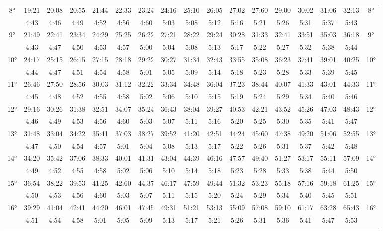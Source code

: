 \begin{scriptsize}
\begin{tabular}{c || c | c | c | c | c | c | c | c | c | c | c | c | c | c | c || c}
		\multirow{2}{*}{8°}&19:21&20:08&20:55&21:44&22:33&23:24&24:16&25:10&26:05&27:02&27:60&29:00&30:02&31:06&32:13&\multirow{2}{*}{8°}\\ \space&4:43&4:46&4:49&4:52&4:56&4:60&5:03&5:08&5:12&5:16&5:21&5:26&5:31&5:37&5:43&\space\\\hline
		\multirow{2}{*}{9°}&21:49&22:41&23:34&24:29&25:25&26:22&27:21&28:22&29:24&30:28&31:33&32:41&33:51&35:03&36:18&\multirow{2}{*}{9°}\\ \space&4:43&4:47&4:50&4:53&4:57&5:00&5:04&5:08&5:13&5:17&5:22&5:27&5:32&5:38&5:44&\space\\\hline
		\multirow{2}{*}{10°}&24:17&25:15&26:15&27:15&28:18&29:22&30:27&31:34&32:43&33:55&35:08&36:23&37:41&39:01&40:25&\multirow{2}{*}{10°}\\ \space&4:44&4:47&4:51&4:54&4:58&5:01&5:05&5:09&5:14&5:18&5:23&5:28&5:33&5:39&5:45&\space\\\hline
		\multirow{2}{*}{11°}&26:46&27:50&28:56&30:03&31:12&32:22&33:34&34:48&36:04&37:23&38:44&40:07&41:33&43:01&44:33&\multirow{2}{*}{11°}\\ \space&4:45&4:48&4:52&4:55&4:58&5:02&5:06&5:10&5:15&5:19&5:24&5:29&5:34&5:40&5:46&\space\\\hline
		\multirow{2}{*}{12°}&29:16&30:26&31:38&32:51&34:07&35:24&36:43&38:04&39:27&40:53&42:21&43:52&45:26&47:03&48:43&\multirow{2}{*}{12°}\\ \space&4:46&4:49&4:53&4:56&4:60&5:03&5:07&5:11&5:16&5:20&5:25&5:30&5:35&5:41&5:47&\space\\\hline
		\multirow{2}{*}{13°}&31:48&33:04&34:22&35:41&37:03&38:27&39:52&41:20&42:51&44:24&45:60&47:38&49:20&51:06&52:55&\multirow{2}{*}{13°}\\ \space&4:47&4:50&4:54&4:57&5:01&5:04&5:08&5:13&5:17&5:22&5:26&5:31&5:37&5:42&5:48&\space\\\hline
		\multirow{2}{*}{14°}&34:20&35:42&37:06&38:33&40:01&41:31&43:04&44:39&46:16&47:57&49:40&51:27&53:17&55:11&57:09&\multirow{2}{*}{14°}\\ \space&4:49&4:52&4:55&4:58&5:02&5:06&5:10&5:14&5:18&5:23&5:28&5:33&5:38&5:44&5:50&\space\\\hline
		\multirow{2}{*}{15°}&36:54&38:22&39:53&41:25&42:60&44:37&46:17&47:59&49:44&51:32&53:23&55:18&57:16&59:18&61:25&\multirow{2}{*}{15°}\\ \space&4:50&4:53&4:56&4:60&5:03&5:07&5:11&5:15&5:20&5:24&5:29&5:34&5:40&5:45&5:51&\space\\\hline
		\multirow{2}{*}{16°}&39:29&41:04&42:41&44:20&46:01&47:45&49:31&51:21&53:13&55:09&57:08&59:10&61:17&63:28&65:43&\multirow{2}{*}{16°}\\ \space&4:51&4:54&4:58&5:01&5:05&5:09&5:13&5:17&5:21&5:26&5:31&5:36&5:41&5:47&5:53&\space\\\hline

\end{tabular}
\end{scriptsize}
